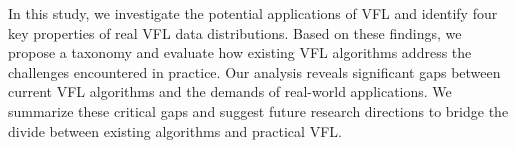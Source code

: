 In this study, we investigate the potential applications of VFL and identify four key properties of real VFL data distributions. Based on these findings, we propose a taxonomy and evaluate how existing VFL algorithms address the challenges encountered in practice. Our analysis reveals significant gaps between current VFL algorithms and the demands of real-world applications. We summarize these critical gaps and suggest future research directions to bridge the divide between existing algorithms and practical VFL.
